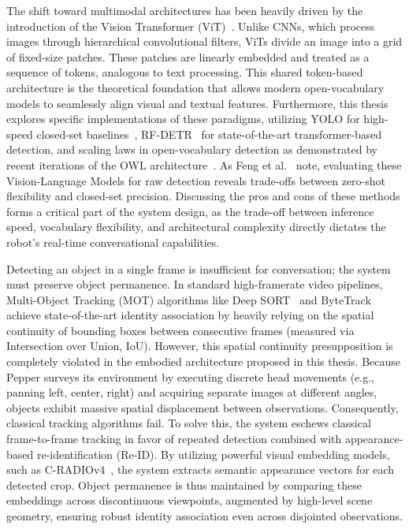 The shift toward multimodal architectures has been heavily driven by the introduction of the Vision Transformer (ViT)~\cite{dosovitskiy2021imageworth16x16words}. Unlike CNNs, which process images through hierarchical convolutional filters, ViTs divide an image into a grid of fixed-size patches. These patches are linearly embedded and treated as a sequence of tokens, analogous to text processing. This shared token-based architecture is the theoretical foundation that allows modern open-vocabulary models to seamlessly align visual and textual features. Furthermore, this thesis explores specific implementations of these paradigms, utilizing YOLO for high-speed closed-set baselines~\cite{zhao2024detrsbeatyolosrealtime}, RF-DETR~\cite{robinson2026rfdetrneuralarchitecturesearch} for state-of-the-art transformer-based detection, and scaling laws in open-vocabulary detection as demonstrated by recent iterations of the OWL architecture~\cite{minderer2024scalingopenvocabularyobjectdetection}. As Feng et al.~\cite{feng_vision-language_2025} note, evaluating these Vision-Language Models for raw detection reveals trade-offs between zero-shot flexibility and closed-set precision. Discussing the pros and cons of these methods forms a critical part of the system design, as the trade-off between inference speed, vocabulary flexibility, and architectural complexity directly dictates the robot's real-time conversational capabilities.

Detecting an object in a single frame is insufficient for conversation; the system must preserve object permanence. In standard high-framerate video pipelines, Multi-Object Tracking (MOT) algorithms like Deep SORT~\cite{wojke_simple_2017} and ByteTrack~\cite{zhang_bytetrack_2022} achieve state-of-the-art identity association by heavily relying on the spatial continuity of bounding boxes between consecutive frames (measured via Intersection over Union, IoU). However, this spatial continuity presupposition is completely violated in the embodied architecture proposed in this thesis. Because Pepper surveys its environment by executing discrete head movements (e.g., panning left, center, right) and acquiring separate images at different angles, objects exhibit massive spatial displacement between observations. Consequently, classical tracking algorithms fail. To solve this, the system eschews classical frame-to-frame tracking in favor of repeated detection combined with appearance-based re-identification (Re-ID). By utilizing powerful visual embedding models, such as C-RADIOv4~\cite{ranzinger2026cradiov4techreport}, the system extracts semantic appearance vectors for each detected crop. Object permanence is thus maintained by comparing these embeddings across discontinuous viewpoints, augmented by high-level scene geometry, ensuring robust identity association even across disjointed observations.


